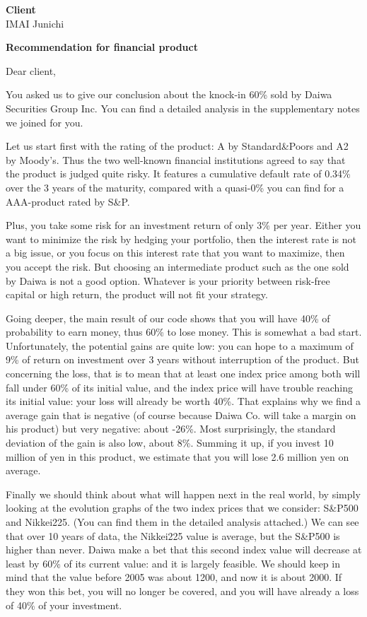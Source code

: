 \documentclass[a4paper,10pt]{letter}
\begin{document}
\begin{letter}{\textbf{Client}\\ 
               IMAI Junichi\\}

\opening{\vspace{50pt}
\textbf{Recommendation for financial product}}

Dear client,

You asked us to give our conclusion about the knock-in 60\% sold by Daiwa Securities Group Inc. You can find a detailed analysis in the supplementary notes we joined for you.

Let us start first with the rating of the product: A by Standard\&Poors and A2 by Moody's.
Thus the two well-known financial institutions agreed to say that the product is judged quite risky. It features a cumulative default rate of 0.34\% over the 3 years of the maturity, compared with a quasi-0\% you can find for a AAA-product rated by S\&P.

Plus, you take some risk for an investment return of only 3\% per year. Either you want to minimize the risk by hedging your portfolio, then the interest rate is not a big issue, or you focus on this interest rate that you want to maximize, then you accept the risk. But choosing an intermediate product such as the one sold by Daiwa is not a good option. Whatever is your priority between risk-free capital or high return, the product will not fit your strategy.

Going deeper, the main result of our code shows that you will have 40\% of probability to earn money, thus 60\% to lose money. This is somewhat a bad start. Unfortunately, the potential gains are quite low: you can hope to a maximum of 9\% of return on investment over 3 years without interruption of the product. But concerning the loss, that is to mean that at least one index price among both will fall under 60\% of its initial value, and the index price will have trouble reaching its initial value: your loss will already be worth 40\%. That explains why we find a average gain that is negative (of course because Daiwa Co. will take a margin on his product) but very negative: about -26\%. Most surprisingly, the standard deviation of the gain is also low, about 8\%. Summing it up, if you invest 10 million of yen in this product, we estimate that you will lose 2.6 million yen on average.

Finally we should think about what will happen next in the real world, by simply looking at the evolution graphs of the two index prices that we consider: S\&P500 and Nikkei225. (You can find them in the detailed analysis attached.) We can see that over 10 years of data, the Nikkei225 value is average, but the S\&P500 is higher than never. Daiwa make a bet that this second index value will decrease at least by 60\% of its current value: and it is largely feasible. We should keep in mind that the value before 2005 was about 1200, and now it is about 2000. If they won this bet, you will no longer be covered, and you will have already a loss of 40\% of your investment.


\end{letter}
\end{document}
